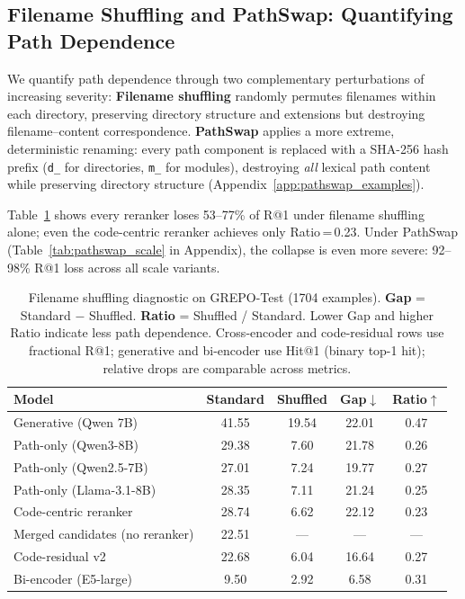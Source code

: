 \documentclass{article}
\begin{document}
\subsection{Filename Shuffling and PathSwap: Quantifying Path Dependence}
\label{sec:pathswap}

We quantify path dependence through two complementary perturbations of increasing severity:
\textbf{Filename shuffling} randomly permutes filenames within each directory, preserving directory structure and extensions but destroying filename--content correspondence.
\textbf{PathSwap} applies a more extreme, deterministic renaming: every path component is replaced with a SHA-256 hash prefix (\texttt{d\_} for directories, \texttt{m\_} for modules), destroying \emph{all} lexical path content while preserving directory structure (Appendix~\ref{app:pathswap_examples}).

Table~\ref{tab:pathswap_diagnostic} shows every reranker loses 53--77\% of R@1 under filename shuffling alone; even the code-centric reranker achieves only Ratio\,=\,0.23.
Under PathSwap (Table~\ref{tab:pathswap_scale} in Appendix), the collapse is even more severe: 92--98\% R@1 loss across all scale variants.

\begin{table}[t]
\centering
\caption{Filename shuffling diagnostic on GREPO-Test (1704 examples). \textbf{Gap} = Standard $-$ Shuffled. \textbf{Ratio} = Shuffled / Standard. Lower Gap and higher Ratio indicate less path dependence. Cross-encoder and code-residual rows use fractional R@1; generative and bi-encoder use Hit@1 (binary top-1 hit); relative drops are comparable across metrics.}
\label{tab:pathswap_diagnostic}
\small
\begin{tabular}{lcccc}
\toprule
\textbf{Model} & \textbf{Standard} & \textbf{Shuffled} & \textbf{Gap}$\downarrow$ & \textbf{Ratio}$\uparrow$ \\
\midrule
Generative (Qwen 7B) & 41.55 & 19.54 & 22.01 & 0.47 \\
Path-only (Qwen3-8B) & 29.38 & 7.60 & 21.78 & 0.26 \\
Path-only (Qwen2.5-7B) & 27.01 & 7.24 & 19.77 & 0.27 \\
Path-only (Llama-3.1-8B) & 28.35 & 7.11 & 21.24 & 0.25 \\
Code-centric reranker & 28.74 & 6.62 & 22.12 & 0.23 \\
Merged candidates (no reranker) & 22.51 & --- & --- & --- \\
Code-residual v2 & 22.68 & 6.04 & 16.64 & 0.27 \\
Bi-encoder (E5-large) & 9.50 & 2.92 & 6.58 & 0.31 \\
\bottomrule
\end{tabular}
\end{table}
\end{document}
